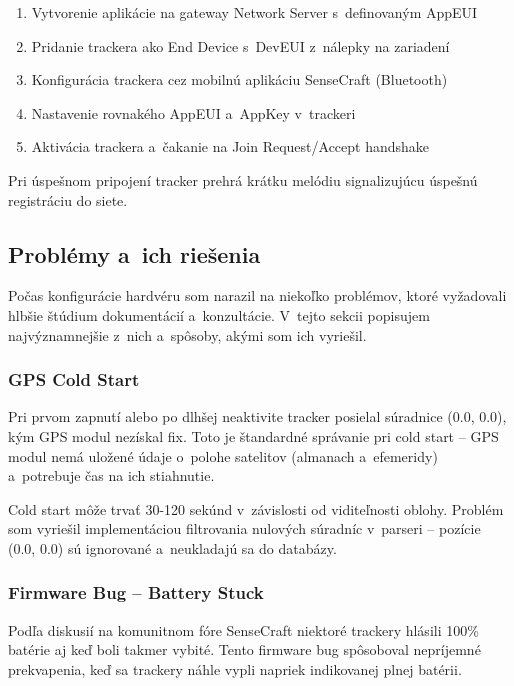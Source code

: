 \begin{enumerate}
    \item Vytvorenie aplikácie na gateway Network Server s~definovaným AppEUI
    \item Pridanie trackera ako End Device s~DevEUI z~nálepky na zariadení
    \item Konfigurácia trackera cez mobilnú aplikáciu SenseCraft (Bluetooth)
    \item Nastavenie rovnakého AppEUI a~AppKey v~trackeri
    \item Aktivácia trackera a~čakanie na Join Request/Accept handshake
\end{enumerate}

Pri úspešnom pripojení tracker prehrá krátku melódiu signalizujúcu úspešnú registráciu do siete.

\subsection{Problémy a~ich riešenia}
\label{sec:HWProblemy}

Počas konfigurácie hardvéru som narazil na niekoľko problémov, ktoré vyžadovali hlbšie štúdium dokumentácií a~konzultácie. V~tejto sekcii popisujem najvýznamnejšie z~nich a~spôsoby, akými som ich vyriešil.

\subsubsection{GPS Cold Start}

Pri prvom zapnutí alebo po dlhšej neaktivite tracker posielal súradnice (0.0, 0.0), kým GPS modul nezískal fix. Toto je štandardné správanie pri cold start -- GPS modul nemá uložené údaje o~polohe satelitov (almanach a~efemeridy) a~potrebuje čas na ich stiahnutie.

Cold start môže trvať 30-120 sekúnd v~závislosti od viditeľnosti oblohy. Problém som vyriešil implementáciou filtrovania nulových súradníc v~parseri -- pozície (0.0, 0.0) sú ignorované a~neukladajú sa do databázy.

\subsubsection{Firmware Bug -- Battery Stuck}

Podľa diskusií na komunitnom fóre SenseCraft niektoré trackery hlásili 100\% batérie aj keď boli takmer vybité. Tento firmware bug spôsoboval nepríjemné prekvapenia, keď sa trackery náhle vypli napriek indikovanej plnej batérii.

